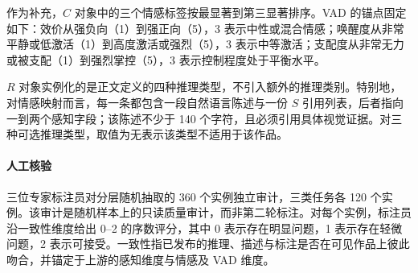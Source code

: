 作为补充，$C$ 对象中的三个情感标签按最显著到第三显著排序。VAD 的锚点固定如下：效价从强负向（1）到强正向（5），3 表示中性或混合情感；唤醒度从非常平静或低激活（1）到高度激活或强烈（5），3 表示中等激活；支配度从非常无力或被支配（1）到强烈掌控（5），3 表示控制程度处于平衡水平。

$R$ 对象实例化的是正文定义的四种推理类型，不引入额外的推理类别。特别地，对情感映射而言，每一条都包含一段自然语言陈述与一份 $S$ 引用列表，后者指向一到两个感知字段；该陈述不少于 140 个字符，且必须引用具体视觉证据。对三种可选推理类型，取值为无表示该类型不适用于该作品。

\paragraph{人工核验}
\label{app:human_verification}

三位专家标注员对分层随机抽取的 360 个实例独立审计，三类任务各 120 个实例。该审计是随机样本上的只读质量审计，而非第二轮标注。对每个实例，标注员沿一致性维度给出 0--2 的序数评分，其中 0 表示存在明显问题，1 表示存在轻微问题，2 表示可接受。一致性指已发布的推理、描述与标注是否在可见作品上彼此吻合，并锚定于上游的感知维度与情感及 VAD 维度。
